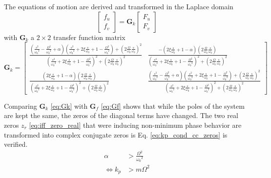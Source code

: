 \documentclass{ISMA_USD2020}
\begin{document}
The equations of motion are derived and transformed in the Laplace domain
\begin{equation}
\label{eq:Gk_mimo_tf}
\begin{bmatrix} f_u \\ f_v \end{bmatrix} =
\bm{G}_k
\begin{bmatrix} F_u \\ F_v \end{bmatrix}
\end{equation}
with \(\bm{G}_k\) a \(2 \times 2\) transfer function matrix
\begin{equation}
\label{eq:Gk}
\bm{G}_k =
\begin{bmatrix}
  \frac{\left( \frac{s^2}{{\omega_0}^2} - \frac{\Omega^2}{{\omega_0}^2} + \alpha \right) \left( \frac{s^2}{{\omega_0}^2} + 2 \xi \frac{s}{\omega_0} + 1 - \frac{{\Omega}^2}{{\omega_0}^2} \right) + \left( 2 \frac{\Omega}{\omega_0} \frac{s}{\omega_0} \right)^2}{\left( \frac{s^2}{{\omega_0}^2} + 2 \xi \frac{s}{\omega_0} + 1 - \frac{{\Omega}^2}{{\omega_0}^2} \right)^2 + \left( 2 \frac{\Omega}{\omega_0} \frac{s}{\omega_0} \right)^2} & \frac{- \left( 2 \xi \frac{s}{\omega_0} + 1 - \alpha \right) \left( 2 \frac{\Omega}{\omega_0} \frac{s}{\omega_0} \right)}{\left( \frac{s^2}{{\omega_0}^2} + 2 \xi \frac{s}{\omega_0} + 1 - \frac{{\Omega}^2}{{\omega_0}^2} \right)^2 + \left( 2 \frac{\Omega}{\omega_0} \frac{s}{\omega_0} \right)^2} \\
  \frac{\left( 2 \xi \frac{s}{\omega_0} + 1 - \alpha \right) \left( 2 \frac{\Omega}{\omega_0} \frac{s}{\omega_0} \right)}{\left( \frac{s^2}{{\omega_0}^2} + 2 \xi \frac{s}{\omega_0} + 1 - \frac{{\Omega}^2}{{\omega_0}^2} \right)^2 + \left( 2 \frac{\Omega}{\omega_0} \frac{s}{\omega_0} \right)^2} & \frac{\left( \frac{s^2}{{\omega_0}^2} - \frac{\Omega^2}{{\omega_0}^2} + \alpha \right) \left( \frac{s^2}{{\omega_0}^2} + 2 \xi \frac{s}{\omega_0} + 1 - \frac{{\Omega}^2}{{\omega_0}^2} \right) + \left( 2 \frac{\Omega}{\omega_0} \frac{s}{\omega_0} \right)^2}{\left( \frac{s^2}{{\omega_0}^2} + 2 \xi \frac{s}{\omega_0} + 1 - \frac{{\Omega}^2}{{\omega_0}^2} \right)^2 + \left( 2 \frac{\Omega}{\omega_0} \frac{s}{\omega_0} \right)^2}
\end{bmatrix}
\end{equation}

Comparing \(\bm{G}_k\) \eqref{eq:Gk} with \(\bm{G}_f\) \eqref{eq:Gf} shows that while the poles of the system are kept the same, the zeros of the diagonal terms have changed.
The two real zeros \(z_r\) \eqref{eq:iff_zero_real} that were inducing non-minimum phase behavior are transformed into complex conjugate zeros is Eq. \ref{eq:kp_cond_cc_zeros} is verified.
\begin{equation}
\label{eq:kp_cond_cc_zeros}
  \begin{aligned}
    \alpha &> \frac{\Omega^2}{{\omega_0}^2} \\
    \Leftrightarrow k_p &> m \Omega^2
  \end{aligned}
\end{equation}
\end{document}
